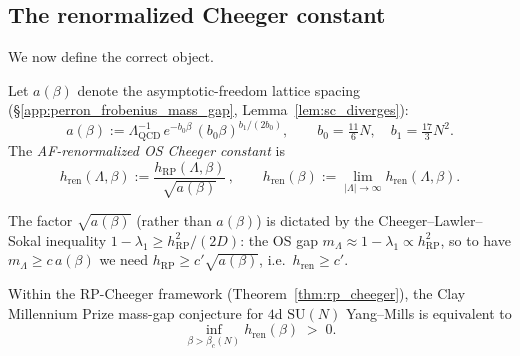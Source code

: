 \subsection{The renormalized Cheeger constant}
\label{ssec:h_ren}

We now define the correct object.

\begin{definition}
\label{def:h_ren}
Let $a(\beta)$ denote the asymptotic-freedom lattice spacing
(\S\ref{app:perron_frobenius_mass_gap}, Lemma~\ref{lem:sc_diverges}):
\begin{equation}
\label{eq:af_spacing}
  a(\beta):=\Lambda_{\mathrm{QCD}}^{-1}\,
  e^{-b_{0}\beta}\,(b_{0}\beta)^{b_{1}/(2b_{0})},
  \qquad
  b_{0}=\tfrac{11}{6}N,\quad b_{1}=\tfrac{17}{3}N^{2}.
\end{equation}
The \emph{AF-renormalized OS Cheeger constant} is
\begin{equation}
\label{eq:h_ren_def}
  h_{\mathrm{ren}}(\Lambda,\beta)
  :=\frac{h_{\mathrm{RP}}(\Lambda,\beta)}
         {\sqrt{a(\beta)}}\,,
  \qquad
  h_{\mathrm{ren}}(\beta):=\lim_{|\Lambda|\to\infty}h_{\mathrm{ren}}
  (\Lambda,\beta).
\end{equation}
\end{definition}

\begin{remark}
\label{rem:sqrt_a}
The factor $\sqrt{a(\beta)}$ (rather than $a(\beta)$) is dictated
by the Cheeger--Lawler--Sokal inequality
$1-\lambda_{1}\ge h_{\mathrm{RP}}^{2}/(2D)$: the OS gap
$m_{\Lambda}\approx1-\lambda_{1}\propto h_{\mathrm{RP}}^{2}$, so
to have $m_{\Lambda}\ge c\,a(\beta)$ we need
$h_{\mathrm{RP}}\ge c'\sqrt{a(\beta)}$, i.e.\ $h_{\mathrm{ren}}\ge c'$.
\end{remark}

\begin{theorem}
\label{thm:clay_renorm_equiv}
Within the RP-Cheeger framework
(Theorem~\ref{thm:rp_cheeger}), the Clay Millennium Prize
mass-gap conjecture for $4$d $\mathrm{SU}(N)$ Yang--Mills is
equivalent to
\begin{equation}
\label{eq:clay_renorm}
  \inf_{\beta>\beta_{c}(N)}h_{\mathrm{ren}}(\beta)\;>\;0.
\end{equation}
\end{theorem}

